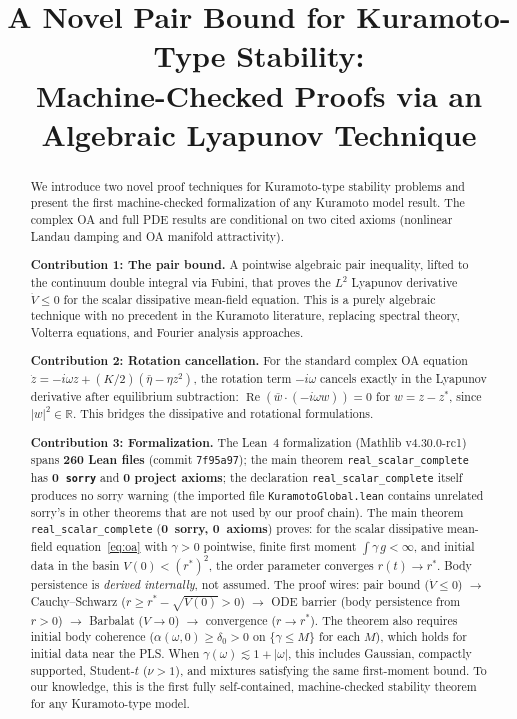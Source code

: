 \documentclass[11pt,a4paper]{article}
\title{A Novel Pair Bound for Kuramoto-Type Stability:\\
Machine-Checked Proofs via an Algebraic Lyapunov Technique}
\author{}
\date{}
\theoremstyle{definition}
\DeclareMathOperator{\re}{Re}
\newcommand{\R}{\mathbb{R}}
\begin{document}
\maketitle

\begin{abstract}
We introduce two novel proof techniques for Kuramoto-type stability problems and present the first machine-checked formalization of any Kuramoto model result. The complex OA and full PDE results are conditional on two cited axioms (nonlinear Landau damping and OA manifold attractivity).

\textbf{Contribution 1: The pair bound.} A pointwise algebraic pair inequality, lifted to the continuum double integral via Fubini, that proves the $L^2$ Lyapunov derivative $\dot V \leq 0$ for the scalar dissipative mean-field equation. This is a purely algebraic technique with no precedent in the Kuramoto literature, replacing spectral theory, Volterra equations, and Fourier analysis approaches.

\textbf{Contribution 2: Rotation cancellation.} For the standard complex OA equation $\dot z = -i\omega z + (K/2)(\bar\eta - \eta z^2)$, the rotation term $-i\omega$ cancels exactly in the Lyapunov derivative after equilibrium subtraction: $\re(\bar w \cdot (-i\omega w)) = 0$ for $w = z - z^*$, since $|w|^2 \in \R$. This bridges the dissipative and rotational formulations.

\textbf{Contribution 3: Formalization.} The Lean~4 formalization (Mathlib v4.30.0-rc1) spans \textbf{260 Lean files} (commit \texttt{7f95a97}); the main theorem \texttt{real\_scalar\_complete} has \textbf{0~\texttt{sorry}} and \textbf{0 project axioms}; the declaration \texttt{real\_scalar\_complete} itself produces no sorry warning (the imported file \texttt{KuramotoGlobal.lean} contains unrelated sorry's in other theorems that are not used by our proof chain). The main theorem \texttt{real\_scalar\_complete} (\textbf{0~sorry, 0~axioms}) proves: for the scalar dissipative mean-field equation~\eqref{eq:oa} with $\gamma > 0$ pointwise, finite first moment $\int\gamma\,g < \infty$, and initial data in the basin $V(0) < (r^*)^2$, the order parameter converges $r(t) \to r^*$. Body persistence is \emph{derived internally}, not assumed. The proof wires: pair bound ($\dot V \leq 0$) $\to$ Cauchy--Schwarz ($r \geq r^* - \sqrt{V(0)} > 0$) $\to$ ODE barrier (body persistence from $r > 0$) $\to$ Barbalat ($V \to 0$) $\to$ convergence ($r \to r^*$). The theorem also requires initial body coherence ($\alpha(\omega,0) \geq \delta_0 > 0$ on $\{\gamma \leq M\}$ for each $M$), which holds for initial data near the PLS. When $\gamma(\omega) \lesssim 1 + |\omega|$, this includes Gaussian, compactly supported, Student-$t$ ($\nu > 1$), and mixtures satisfying the same first-moment bound. To our knowledge, this is the first fully self-contained, machine-checked stability theorem for any Kuramoto-type model.
\end{abstract}
\end{document}
